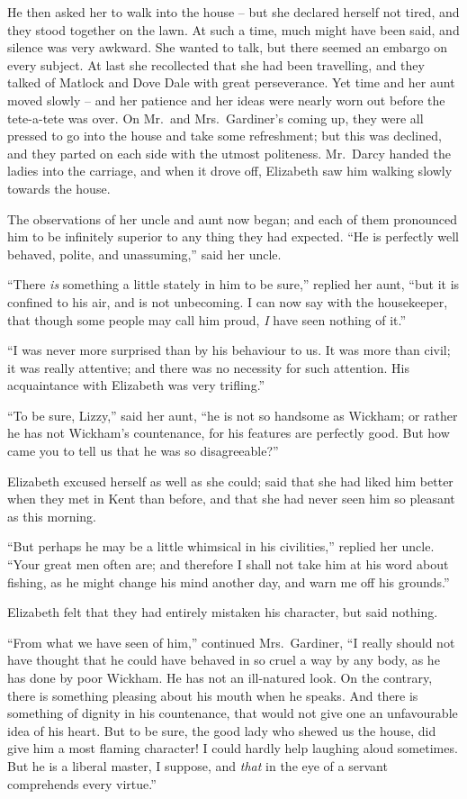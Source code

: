 He then asked her to walk into the house -- but she
declared herself not tired, and they stood together on the
lawn. At such a time, much might have been said, and
silence was very awkward. She wanted to talk, but
there seemed an embargo on every subject. At last she
recollected that she had been travelling, and they talked
of Matlock and Dove Dale with great perseverance. Yet
time and her aunt moved slowly -- and her patience and
her ideas were nearly worn out before the tete-a-tete was
over. On Mr.\ and Mrs.\ Gardiner’s coming up, they were
all pressed to go into the house and take some refreshment;
but this was declined, and they parted on each
side with the utmost politeness. Mr.\ Darcy handed the
ladies into the carriage, and when it drove off, Elizabeth
saw him walking slowly towards the house.

The observations of her uncle and aunt now began; and
each of them pronounced him to be infinitely superior to
any thing they had expected. “He is perfectly well
behaved, polite, and unassuming,” said her uncle.

“There \textit{is} something a little stately in him to be sure,”
replied her aunt, “but it is confined to his air, and is
not unbecoming. I can now say with the housekeeper,
that though some people may call him proud, \textit{I} have seen
nothing of it.”

“I was never more surprised than by his behaviour to
us. It was more than civil; it was really attentive; and
there was no necessity for such attention. His acquaintance
with Elizabeth was very trifling.”

“To be sure, Lizzy,” said her aunt, “he is not so handsome
as Wickham; or rather he has not Wickham’s
countenance, for his features are perfectly good. But how
came you to tell us that he was so disagreeable?”

Elizabeth excused herself as well as she could; said
that she had liked him better when they met in Kent than
before, and that she had never seen him so pleasant as
this morning.

“But perhaps he may be a little whimsical in his
civilities,” replied her uncle. “Your great men often are;
and therefore I shall not take him at his word about
fishing, as he might change his mind another day, and
warn me off his grounds.”

Elizabeth felt that they had entirely mistaken his
character, but said nothing.

“From what we have seen of him,” continued Mrs.\ Gardiner,
“I really should not have thought that he could
have behaved in so cruel a way by any body, as he has
done by poor Wickham. He has not an ill-natured look.
On the contrary, there is something pleasing about his
mouth when he speaks. And there is something of dignity
in his countenance, that would not give one an unfavourable
idea of his heart. But to be sure, the good lady who
shewed us the house, did give him a most flaming character!
I could hardly help laughing aloud sometimes. But he
is a liberal master, I suppose, and \textit{that} in the eye of a servant
comprehends every virtue.”

